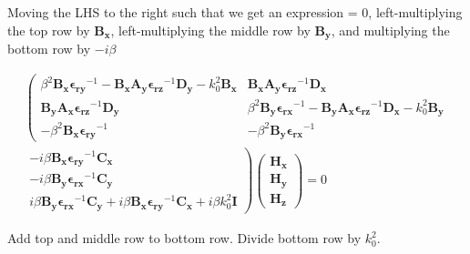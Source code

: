\documentclass[]{article}
\begin{document}
Moving the LHS to the right such that we get an expression = 0, left-multiplying the top row by $\mathbf{B_x}$, left-multiplying the middle row by $\mathbf{B_y}$, and multiplying the bottom row by $-i \beta$

\begin{multline*}
\left(
\begin{matrix}
\beta^2 \mathbf{B_x} \mathbf{\epsilon_{ry}}^{-1} - \mathbf{B_x} \mathbf{A_y} \mathbf{\epsilon_{rz}}^{-1} \mathbf{D_y} - k_0^2 \mathbf{B_x} 
&
\mathbf{B_x} \mathbf{A_y} \mathbf{\epsilon_{rz}}^{-1} \mathbf{D_x}
\\
\mathbf{B_y} \mathbf{A_x} \mathbf{\epsilon_{rz}}^{-1} \mathbf{D_y} 
& 
\beta^2 \mathbf{B_y} \mathbf{\epsilon_{rx}}^{-1} - \mathbf{B_y} \mathbf{A_x} \mathbf{\epsilon_{rz}}^{-1} \mathbf{D_x} - k_0^2 \mathbf{B_y}
\\
-\beta^2 \mathbf{B_x} \mathbf{\epsilon_{ry}}^{-1}
& 
-\beta^2 \mathbf{B_y} \mathbf{\epsilon_{rx}}^{-1}
\end{matrix}
\right.
\\
\left.
\begin{matrix}
-i \beta \mathbf{B_x} \mathbf{\epsilon_{ry}}^{-1} \mathbf{C_x}
\\
-i \beta \mathbf{B_y} \mathbf{\epsilon_{rx}}^{-1} \mathbf{C_y}
\\
i \beta \mathbf{B_y} \mathbf{\epsilon_{rx}}^{-1} \mathbf{C_y} + i \beta \mathbf{B_x} \mathbf{\epsilon_{ry}}^{-1} \mathbf{C_x} + i \beta k_0^2 \mathbf{I}
\end{matrix}
\right)
\begin{pmatrix}
\mathbf{H_x} \\
\mathbf{H_y} \\
\mathbf{H_z}
\end{pmatrix}
=0
\end{multline*}

Add top and middle row to bottom row. Divide bottom row by $k_0^2$.
\end{document}
